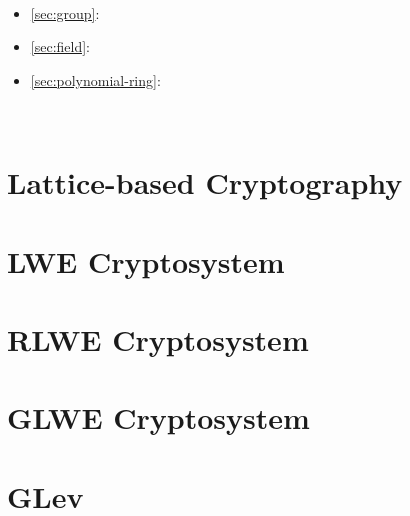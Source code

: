 \documentclass[11pt]{article}
\begin{document}
$ $

\begin{tcolorbox}[
    title = \textbf{Required Background},    %
    colback = white,    %
    colframe = black,  %
    boxrule = 0.8pt,     %
    left = 1mm, right = 1mm, top = 1mm, bottom = 1mm %
]



\begin{itemize}
\item \autoref{sec:group}: 
\item \autoref{sec:field}: 
\item \autoref{sec:polynomial-ring}: 
\end{itemize}

\end{tcolorbox}

$ $

\clearpage

\section{Lattice-based Cryptography}
\label{sec:lattice}


\clearpage

\section{LWE Cryptosystem}
\label{sec:lwe}


\clearpage

\section{RLWE Cryptosystem}
\label{sec:rlwe}


\clearpage

\section{GLWE Cryptosystem} 
\label{sec:glwe}


\clearpage

\section{GLev}
\label{sec:glev}

\end{document}
